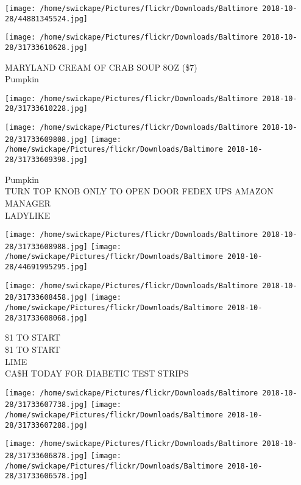 \documentclass[10pt,letterpaper]{article}
\begin{document}
\texttt{[image: /home/swickape/Pictures/flickr/Downloads/Baltimore 2018-10-28/44881345524.jpg]}

\vspace{0.25in}
\texttt{[image: /home/swickape/Pictures/flickr/Downloads/Baltimore 2018-10-28/31733610628.jpg]}

MARYLAND CREAM OF CRAB SOUP 8OZ (\$7)\\
Pumpkin\\
\pagebreak

\texttt{[image: /home/swickape/Pictures/flickr/Downloads/Baltimore 2018-10-28/31733610228.jpg]}

\vspace{0.25in}
\texttt{[image: /home/swickape/Pictures/flickr/Downloads/Baltimore 2018-10-28/31733609808.jpg]}
\texttt{[image: /home/swickape/Pictures/flickr/Downloads/Baltimore 2018-10-28/31733609398.jpg]}

Pumpkin\\
TURN TOP KNOB ONLY TO OPEN DOOR FEDEX UPS AMAZON MANAGER\\
LADYLIKE\\
\pagebreak

\texttt{[image: /home/swickape/Pictures/flickr/Downloads/Baltimore 2018-10-28/31733608988.jpg]}
\texttt{[image: /home/swickape/Pictures/flickr/Downloads/Baltimore 2018-10-28/44691995295.jpg]}

\texttt{[image: /home/swickape/Pictures/flickr/Downloads/Baltimore 2018-10-28/31733608458.jpg]}
\texttt{[image: /home/swickape/Pictures/flickr/Downloads/Baltimore 2018-10-28/31733608068.jpg]}

\$1 TO START\\
\$1 TO START\\
LIME\\
CA\$H TODAY FOR DIABETIC TEST STRIPS\\
\pagebreak

\texttt{[image: /home/swickape/Pictures/flickr/Downloads/Baltimore 2018-10-28/31733607738.jpg]}
\texttt{[image: /home/swickape/Pictures/flickr/Downloads/Baltimore 2018-10-28/31733607288.jpg]}

\texttt{[image: /home/swickape/Pictures/flickr/Downloads/Baltimore 2018-10-28/31733606878.jpg]}
\texttt{[image: /home/swickape/Pictures/flickr/Downloads/Baltimore 2018-10-28/31733606578.jpg]}
\end{document}
